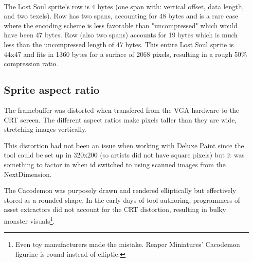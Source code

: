 \\
\par
The Lost Soul sprite's row  is 4 bytes (one span with:  vertical offset,  data length,  and  two texels). Row  has two spans, accounting for 48 bytes and is a rare case where the encoding scheme is less favorable than "uncompressed" which would have been 47 bytes. Row  (also two spans) accounts for 19 bytes which is much less than the uncompressed length of 47 bytes. This entire Lost Soul sprite is 44x47 and fits in 1360 bytes for a surface of 2068 pixels, resulting in a rough 50\% compression ratio.\\
\par
\vspace{-10pt}
\subsection{Sprite aspect ratio}
The framebuffer was distorted when transfered from the VGA hardware to the CRT screen. The different aspect ratios make pixels taller than they are wide, stretching images vertically.\\
\par
This distortion had not been an issue when working with Deluxe Paint since the tool could be set up in 320x200 (so artists did not have square pixels) but it was something to factor in when id switched to using scanned images from the NextDimension.




\par
\vspace{-5pt}
The Cacodemon was purposely drawn and rendered elliptically but effectively stored as a rounded shape. In the early days of tool authoring, programmers of asset extractors did not account for the CRT distortion, resulting in bulky monster visuals\footnote{Even toy manufacturers made the mistake. Reaper Miniatures' Cacodemon figurine is round instead of elliptic.}.\\
\par
\vspace{-5pt}
{
\setlength{\belowcaptionskip}{-10pt}
}
